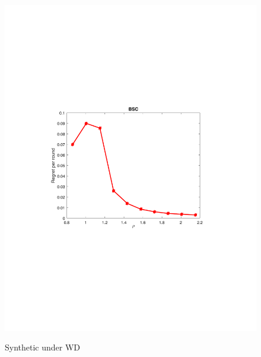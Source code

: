 \begin{figure}[!bt]
\begin{minipage}{4cm}
		\includegraphics[scale=0.3]{../Simulations/Figures/BSC_WD2}
		\label{fig:BSC_WD}
		\vspace{-.5cm}
		\caption{Synthetic under WD}
	\end{minipage}
	\begin{minipage}{4cm}
		\centering

\end{minipage}
\end{figure}
